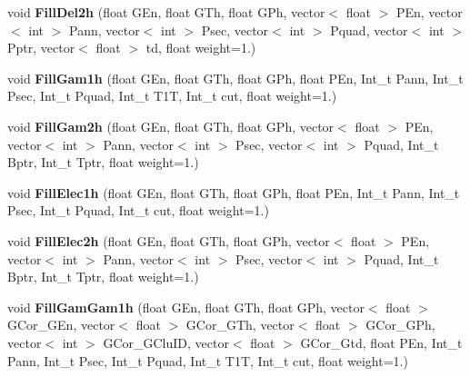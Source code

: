 \begin{DoxyCompactItemize}
\item 
\hypertarget{classhists_a2129f29167f7fdb68978412d81030844}{void {\bfseries Fill\-Del2h} (float G\-En, float G\-Th, float G\-Ph, vector$<$ float $>$ P\-En, vector$<$ int $>$ Pann, vector$<$ int $>$ Psec, vector$<$ int $>$ Pquad, vector$<$ int $>$ Pptr, vector$<$ float $>$ td, float weight=1.)}\label{classhists_a2129f29167f7fdb68978412d81030844}

\item 
\hypertarget{classhists_af555a97407e075689f176db774c87da3}{void {\bfseries Fill\-Gam1h} (float G\-En, float G\-Th, float G\-Ph, float P\-En, Int\-\_\-t Pann, Int\-\_\-t Psec, Int\-\_\-t Pquad, Int\-\_\-t T1\-T, Int\-\_\-t cut, float weight=1.)}\label{classhists_af555a97407e075689f176db774c87da3}

\item 
\hypertarget{classhists_a37e85d4eeab8262c6809d003d83d220e}{void {\bfseries Fill\-Gam2h} (float G\-En, float G\-Th, float G\-Ph, vector$<$ float $>$ P\-En, vector$<$ int $>$ Pann, vector$<$ int $>$ Psec, vector$<$ int $>$ Pquad, Int\-\_\-t Bptr, Int\-\_\-t Tptr, float weight=1.)}\label{classhists_a37e85d4eeab8262c6809d003d83d220e}

\item 
\hypertarget{classhists_a5c04c8d7cdb40e45f7ba00464c6835e1}{void {\bfseries Fill\-Elec1h} (float G\-En, float G\-Th, float G\-Ph, float P\-En, Int\-\_\-t Pann, Int\-\_\-t Psec, Int\-\_\-t Pquad, Int\-\_\-t cut, float weight=1.)}\label{classhists_a5c04c8d7cdb40e45f7ba00464c6835e1}

\item 
\hypertarget{classhists_a1734b966a54b280c42524291ddcd60c8}{void {\bfseries Fill\-Elec2h} (float G\-En, float G\-Th, float G\-Ph, vector$<$ float $>$ P\-En, vector$<$ int $>$ Pann, vector$<$ int $>$ Psec, vector$<$ int $>$ Pquad, Int\-\_\-t Bptr, Int\-\_\-t Tptr, float weight=1.)}\label{classhists_a1734b966a54b280c42524291ddcd60c8}

\item 
\hypertarget{classhists_ae7189f12a2d600e8b58affcdc4816638}{void {\bfseries Fill\-Gam\-Gam1h} (float G\-En, float G\-Th, float G\-Ph, vector$<$ float $>$ G\-Cor\-\_\-\-G\-En, vector$<$ float $>$ G\-Cor\-\_\-\-G\-Th, vector$<$ float $>$ G\-Cor\-\_\-\-G\-Ph, vector$<$ int $>$ G\-Cor\-\_\-\-G\-Clu\-I\-D, vector$<$ float $>$ G\-Cor\-\_\-\-Gtd, float P\-En, Int\-\_\-t Pann, Int\-\_\-t Psec, Int\-\_\-t Pquad, Int\-\_\-t T1\-T, Int\-\_\-t cut, float weight=1.)}\label{classhists_ae7189f12a2d600e8b58affcdc4816638}


\end{DoxyCompactItemize}
